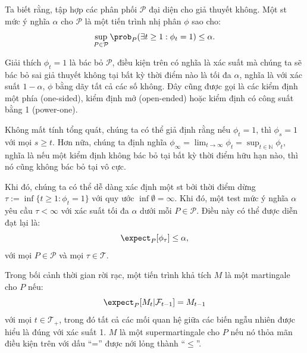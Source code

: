 Ta biết rằng, tập hợp các phân phối $\mathcal{P}$ đại diện cho giả thuyết
không. Một \gls{st} mức ý nghĩa $\alpha$ cho $\mathcal{P}$ là một tiến trình
nhị phân $\phi$ sao cho:
\begin{equation}
    \sup_{P \in \mathcal{P}} \prob_P(\exists t \geq 1 : \phi_t = 1) \leq
    \alpha.
\end{equation}

Giải thích $\phi_t = 1$ là bác bỏ $\mathcal{P}$, điều kiện trên có nghĩa là xác
suất mà chúng ta sẽ bác bỏ sai giả thuyết không tại bất kỳ thời điểm nào là tối
đa $\alpha$, nghĩa là với xác suất $1 - \alpha$, $\phi$ bằng dãy tất cả các số
không. Đây cũng được gọi là các kiểm định một phía (one-sided), kiểm định mở
(open-ended) hoặc kiểm định có công suất bằng 1 (power-one).

Không mất tính tổng quát, chúng ta có thể giả định rằng nếu $\phi_t = 1$, thì
$\phi_s = 1$ với mọi $s \geq t$. Hơn nữa, chúng ta định nghĩa $\phi_\infty =
\lim_{t \to \infty} \phi_t = \sup_{t \in \mathbb{N}} \phi_t$, nghĩa là nếu một
kiểm định không bác bỏ tại bất kỳ thời điểm hữu hạn nào, thì nó cũng không bác
bỏ tại vô cực.

Khi đó, chúng ta có thể dễ dàng xác định một \gls{st} bởi thời điểm dừng
$\tau := \inf\{t \geq 1 : \phi_t = 1\}$ với quy ước $\inf \emptyset = \infty$.
Khi đó, một \gls{test} mức ý nghĩa $\alpha$ yêu cầu $\tau < \infty$ với xác
suất tối đa $\alpha$ dưới mỗi $P \in \mathcal{P}$. Điều này có thể được diễn
đạt lại là:
\begin{equation}
    \expect_P[\phi_\tau] \leq \alpha,
\end{equation}
với mọi $P \in \mathcal{P}$ và mọi $\tau \in \mathcal{T}$.

Trong bối cảnh thời gian rời rạc, một tiến trình khả tích $M$ là một martingale
cho $P$ nếu:
\begin{equation}
    \expect_P[M_t | \mathcal{F}_{t-1}] = M_{t-1}
\end{equation}
với mọi $t \in \mathcal{T}_+$, trong đó tất cả các mối quan hệ giữa các biến
ngẫu nhiên được hiểu là đúng với xác suất 1. $M$ là một supermartingale cho $P$
nếu nó thỏa mãn điều kiện trên với dấu ``='' được nới lỏng thành ``$\leq$''.

